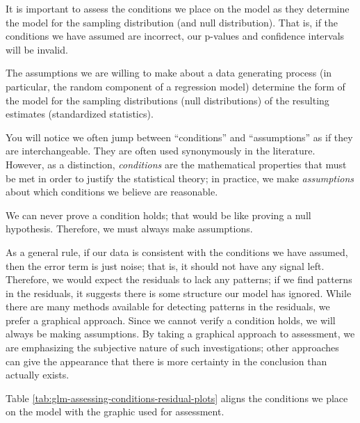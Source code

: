 \documentclass[
]{book}
\theoremstyle{plain}
\theoremstyle{mydefn}
\theoremstyle{myexmpl}
\theoremstyle{remark}
\begin{document}
It is important to assess the conditions we place on the model as they determine the model for the sampling distribution (and null distribution). That is, if the conditions we have assumed are incorrect, our p-values and confidence intervals will be invalid.

\begin{rmdkeyidea}
The assumptions we are willing to make about a data generating process (in particular, the random component of a regression model) determine the form of the model for the sampling distributions (null distributions) of the resulting estimates (standardized statistics).
\end{rmdkeyidea}

\begin{rmdtip}
You will notice we often jump between ``conditions'' and ``assumptions'' as if they are interchangeable. They are often used synonymously in the literature. However, as a distinction, \emph{conditions} are the mathematical properties that must be met in order to justify the statistical theory; in practice, we make \emph{assumptions} about which conditions we believe are reasonable.

We can never prove a condition holds; that would be like proving a null hypothesis. Therefore, we must always make assumptions.
\end{rmdtip}

As a general rule, if our data is consistent with the conditions we have assumed, then the error term is just noise; that is, it should not have any signal left. Therefore, we would expect the residuals to lack any patterns; if we find patterns in the residuals, it suggests there is some structure our model has ignored. While there are many methods available for detecting patterns in the residuals, we prefer a graphical approach. Since we cannot verify a condition holds, we will always be making assumptions. By taking a graphical approach to assessment, we are emphasizing the subjective nature of such investigations; other approaches can give the appearance that there is more certainty in the conclusion than actually exists.

Table \ref{tab:glm-assessing-conditions-residual-plots} aligns the conditions we place on the model with the graphic used for assessment.
\end{document}
